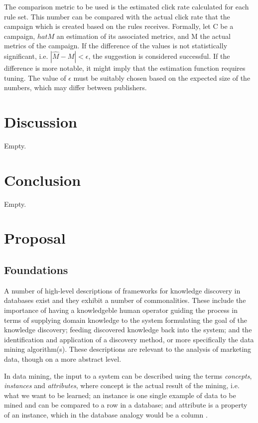 \documentclass[10pt,twocolumn]{article}
\begin{document}
The comparison metric to be used is the estimated click rate calculated for each rule set. This number can be compared with the actual click rate that the campaign which is created based on the rules receives. Formally, let C be a campaign, \(hat{M}\) an estimation of its associated metrics, and M the actual metrics of the campaign. If the difference of the values is not statistically significant, i.e. \(|\hat{M} - M| < \epsilon\), the suggestion is considered successful. If the difference is more notable, it might imply that the estimation function requires tuning. The value of \(\epsilon\) must be suitably chosen based on the expected size of the numbers, which may differ between publishers.

\section{Discussion}
Empty.
\section{Conclusion}
Empty.
\section{Proposal}

\subsection{Foundations}
A number of high-level descriptions of frameworks for knowledge discovery in databases exist \citep{Fayyad1996, Frawley1992} and they exhibit a number of commonalities. These include the importance of having a knowledgeble human operator guiding the process in terms of supplying domain knowledge to the system formulating the goal of the knowledge discovery; feeding discovered knowledge back into the system; and the identification and application of a discovery method, or more specifically the data mining algorithm(s). These descriptions are relevant to the analysis of marketing data, though on a more abstract level.

In data mining, the input to a system can be described using the terms \emph{concepts}, \emph{instances} and \emph{attributes}, where concept is the actual result of the mining, i.e. what we want to be learned; an instance is one single example of data to be mined and can be compared to a row in a database; and attribute is a property of an instance, which in the database analogy would be a column \citep{Witten2011}.
\end{document}
